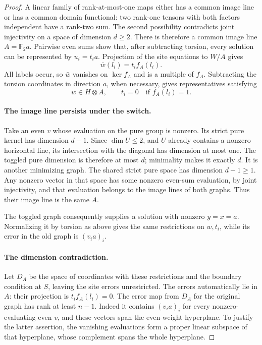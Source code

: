 \begin{proof}
A linear family of rank-at-most-one maps either has a common image line
or has a common domain functional: two rank-one tensors with both factors
independent have a rank-two sum.  The second possibility contradicts joint
injectivity on a space of dimension \(d\ge2\).  There is therefore a
common image line \(A=\mathbb F_2a\).  Pairwise even sums show that, after
subtracting torsion, every solution can be represented by \(u_i=t_i a\).
Projection of the site equations to \(W/A\) gives
\[
 \bar w(l_i)=t_i f_A(l_i).
\]
All labels occur, so \(\bar w\) vanishes on \(\ker f_A\) and is a multiple
of \(f_A\).  Subtracting the torsion coordinates in direction \(a\), when
necessary, gives representatives satisfying
\[
 w\in H\otimes A,\qquad t_i=0\quad\text{if }f_A(l_i)=1.
\]

\paragraph{The image line persists under the switch.}
Take an even \(v\) whose evaluation on the pure group is nonzero.  Its
strict pure kernel has dimension \(d-1\).  Since \(\dim U\le2\), and
\(U\) already contains a nonzero horizontal line, its intersection with
the diagonal has dimension at most one.  The toggled pure dimension is
therefore at most \(d\); minimality makes it exactly \(d\).  It is another
minimizing graph.  The shared strict pure space has dimension
\(d-1\ge1\).  Any nonzero vector in that space has some nonzero even-sum
evaluation, by joint injectivity, and that evaluation belongs to the image
lines of both graphs.  Thus their image line is the same \(A\).

The toggled graph consequently supplies a solution with nonzero
\(y=x=a\).  Normalizing it by torsion as above gives the same restrictions
on \(w,t_i\), while its error in the old graph is \((v_i a)_i\).

\paragraph{The dimension contradiction.}
Let \(D_A\) be the space of coordinates with these restrictions and the
boundary condition at \(S\), leaving the site errors unrestricted.  The
errors automatically lie in \(A\): their projection is
\(t_i f_A(l_i)=0\).  The error map from \(D_A\) for the original graph has
rank at least \(n-1\).  Indeed it contains \((v_i a)_i\) for every
nonzero-evaluating even \(v\), and these vectors span the even-weight
hyperplane.  To justify the latter assertion, the vanishing evaluations
form a proper linear subspace of that hyperplane, whose complement spans
the whole hyperplane.


\end{proof}
